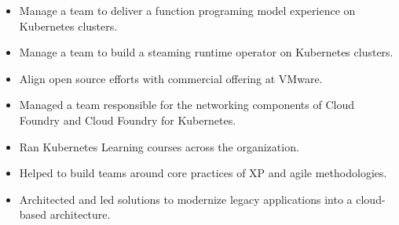 \documentclass[10pt,a4paper,ragged2e,withhyper]{altacv}
\begin{document}


\begin{fullwidth}
\makecvheader
\end{fullwidth}


\begin{paracol}{2}

\begin{itemize}
\item Manage a team to deliver a function programing model experience on Kubernetes clusters.
\item Manage a team to build a steaming runtime operator on Kubernetes clusters.
\item Align open source efforts with commercial offering at VMware.
\end{itemize}

\divider

\begin{itemize}
\item Managed a team responsible for the networking components of Cloud Foundry and Cloud Foundry for Kubernetes.
\item Ran Kubernetes Learning courses across the organization.
\end{itemize}

\divider

\begin{itemize}
\item Helped to build teams around core practices of XP and agile methodologies.
\item Architected and led solutions to modernize legacy applications into a cloud-based architecture.
\end{itemize}


\end{paracol}
\end{document}
